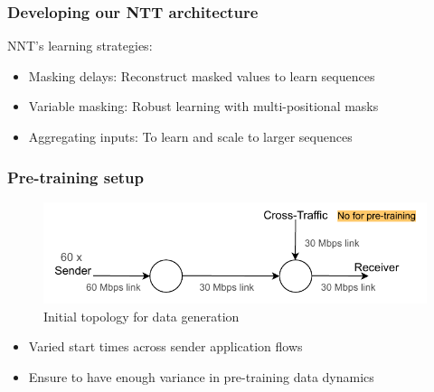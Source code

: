 \documentclass{beamer}
\begin{document}
\begin{frame}
\frametitle{Developing our NTT architecture}

NNT's learning strategies: 
\pause 
\begin{itemize}
    \item<1-> \alert{Masking delays:} Reconstruct masked values to learn sequences 
    \item<1-> \alert{Variable masking:} Robust learning with multi-positional masks
    \item<1-> \alert{Aggregating inputs:} To learn and scale to larger sequences
\end{itemize}
\end{frame}



\begin{frame}
\frametitle{Pre-training setup}


\begin{figure}[h]
  \begin{center}
    \includegraphics[scale=0.8]{figures/simple_topo.pdf}
    \caption{Initial topology for data generation}
    \label{fig:topo}
  \end{center}
\end{figure}
 
 \pause

\begin{itemize}
    \item<1-> Varied start times across sender application flows
    \item<1-> Ensure to have enough variance in pre-training data dynamics 
    \end{itemize}

\end{frame}
\end{document}
